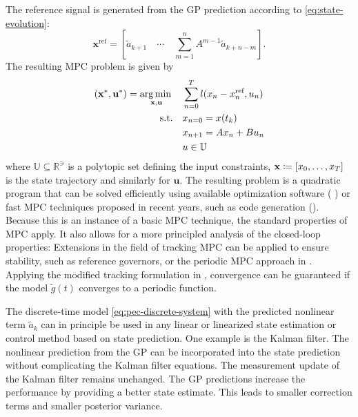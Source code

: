 The reference signal is generated from the GP prediction according to
\eqref{eq:state-evolution}:
\begin{equation}
\label{eq:reference-generation}
  \mathbf{x}^\text{ref} = \left[\tilde a_{k+1}\quad
\cdots\quad \sum_{m=1}^{n} A^{m-1} \tilde a_{k+n-m}\right].
\end{equation}
The resulting MPC problem is given by
\begin{subequations}
\begin{align}
  (\mathbf{x}^*, \mathbf{u}^*)=\underset{\mathbf{x,u}}{\operatorname*{arg\,min\,}} \quad
&\sum_{n=0}^{T} l(x_n - x^\text{ref}_n, u_n)  \\
\text{s.t.}\quad
& x_{n=0} = x(t_k) \\
& x_{n+1} = A x_n + B u_n \\
& u \in \mathbb{U}
\end{align}
\end{subequations}
where $\mathbb{U} \subseteq \mathbb{R}^\ni$ is a polytopic set defining the
input constraints, $\mathbf{x}\coloneqq[x_0,\dots,x_T]$ is the state trajectory and
similarly for $\mathbf{u}$. The resulting problem is a quadratic program that
can be solved efficiently using available optimization software (\eg
\cite{Grant.Boyd:2014:CVX}) or fast MPC techniques proposed in recent years,
such as code generation (\eg \cite{Domahidi:2012:FORCES}). Because this is an
instance of a basic MPC technique, the standard properties of MPC apply. It also
allows for a more principled analysis of the closed-loop properties: Extensions
in the field of tracking MPC can be applied to ensure stability, such as
reference governors, or the periodic MPC approach in
\cite{Limon.Alamo.ea:2012:MPC}. Applying the modified tracking formulation in
, convergence can be guaranteed if the model
$\tilde g(t)$ converges to a periodic function.

\begin{remark}
The discrete-time model \eqref{eq:pec-discrete-system} with the predicted
nonlinear term $\tilde a_k$ can in principle be used in any linear or linearized
state estimation or control method based on state prediction. One example is the
Kalman filter. The nonlinear prediction from the GP can be incorporated into the
state prediction without complicating the Kalman filter equations. The
measurement update of the Kalman filter remains unchanged. The GP predictions
increase the performance by providing a better state estimate. This leads to
smaller correction terms and smaller posterior variance.
\end{remark}

